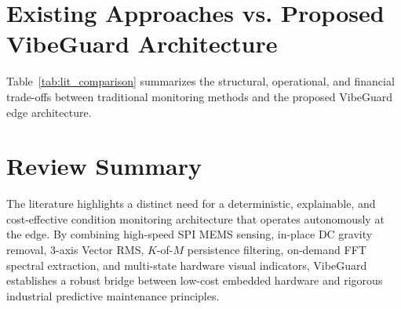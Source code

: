 \section{Existing Approaches vs. Proposed VibeGuard Architecture}
\hspace{2em}Table~\ref{tab:lit_comparison} summarizes the structural, operational, and financial trade-offs between traditional monitoring methods and the proposed VibeGuard edge architecture.

\begin{table}[H]
\centering
\caption{Comparative analysis of existing condition monitoring paradigms against VibeGuard}
\label{tab:lit_comparison}
\small
{}
\end{table}

\section{Review Summary}
\hspace{2em}The literature highlights a distinct need for a deterministic, explainable, and cost-effective condition monitoring architecture that operates autonomously at the edge. By combining high-speed SPI MEMS sensing, in-place DC gravity removal, 3-axis Vector RMS, $K$-of-$M$ persistence filtering, on-demand FFT spectral extraction, and multi-state hardware visual indicators, VibeGuard establishes a robust bridge between low-cost embedded hardware and rigorous industrial predictive maintenance principles.
\clearpage

